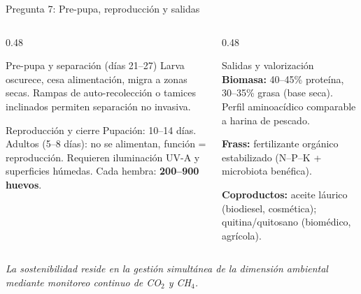 \documentclass[aspectratio=169, 11pt]{beamer}
\begin{document}
\begin{frame}{Pregunta 7: Pre-pupa, reproducción y salidas}
\begin{columns}[T]
\begin{column}{0.48\textwidth}
\begin{block}{Pre-pupa y separación (días 21--27)}
\footnotesize
Larva oscurece, cesa alimentación, migra a zonas secas. Rampas de auto-recolección o tamices inclinados permiten separación no invasiva.
\end{block}
\begin{block}{Reproducción y cierre}
\footnotesize
Pupación: 10--14 días. Adultos (5--8 días): no se alimentan, función = reproducción. Requieren iluminación UV-A y superficies húmedas. Cada hembra: \textbf{200--900 huevos}.
\end{block}
\end{column}
\begin{column}{0.48\textwidth}
\begin{exampleblock}{Salidas y valorización}
\footnotesize
\textbf{Biomasa:} 40--45\% proteína, 30--35\% grasa (base seca). Perfil aminoacídico comparable a harina de pescado.

\textbf{Frass:} fertilizante orgánico estabilizado (N--P--K + microbiota benéfica).

\textbf{Coproductos:} aceite láurico (biodiesel, cosmética); quitina/quitosano (biomédico, agrícola).
\end{exampleblock}
\end{column}
\end{columns}
\vspace{0.2cm}
\centering
\footnotesize\textit{La sostenibilidad reside en la gestión simultánea de la dimensión ambiental mediante monitoreo continuo de CO$_2$ y CH$_4$.}
\end{frame}
\end{document}
